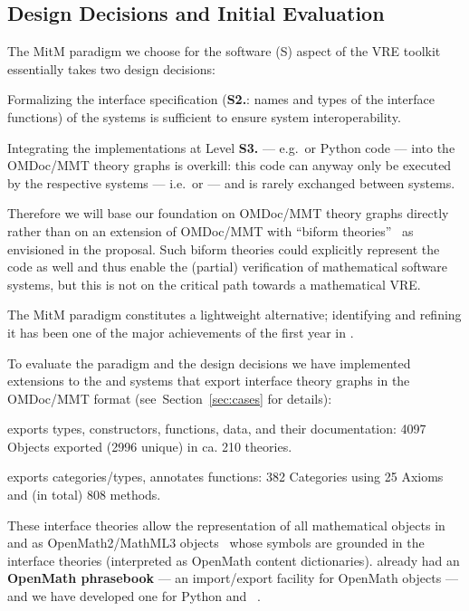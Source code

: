 \subsection{Design Decisions and Initial Evaluation}
The MitM paradigm we choose for the software (S) aspect of the \pn VRE toolkit essentially
takes two design decisions:
\begin{compactenum}[\bf D1.]
\item Formalizing the interface specification (\textbf{S2.}: names and
  types of the interface functions) of the systems is sufficient to ensure system
  interoperability.
\item Integrating the implementations at Level \textbf{S3.} --- e.g.~\GAP or Python code --- into
  the OMDoc/MMT theory graphs is overkill:
  this code can anyway only be executed by the respective systems --- i.e.~\GAP or \SageMath --- and is rarely exchanged between systems.
\end{compactenum}
Therefore we will base our foundation on OMDoc/MMT theory graphs directly rather than on an extension of OMDoc/MMT with
  ``biform theories''~\cite{KohManRab:aumftg13,Farmer:btc07} as envisioned in the
  proposal. Such biform theories could explicitly represent the code as well and thus enable the (partial) verification of mathematical software
  systems, but this is not on the critical path towards a mathematical VRE.

The MitM paradigm constitutes a lightweight alternative; identifying and refining it has
been one of the major achievements of the first year in .

To evaluate the paradigm and the design decisions we have implemented extensions to the
\GAP and \SageMath systems that export interface theory graphs in the OMDoc/MMT format
(see~Section~\ref{sec:cases} for details):
\begin{compactitem}
\item \GAP exports types, constructors, functions, data, and their documentation: 4097
  Objects exported (2996 unique) in ca. 210 theories.
\item \SageMath exports categories/types, annotates functions: 382 Categories using 25
  Axioms and (in total) 808 methods.
\end{compactitem}
These interface theories allow the representation of all mathematical objects in \GAP and
\SageMath as OpenMath2/MathML3 objects~\cite{BusCapCar:2oms03,CarlisleEd:MathML3} whose
symbols are grounded in the interface theories (interpreted as OpenMath content
dictionaries). \GAP already had an \textbf{OpenMath phrasebook} --- an import/export
facility for OpenMath objects --- and we have developed one for Python and
\SageMath~\cite{py-openmath:on}.

